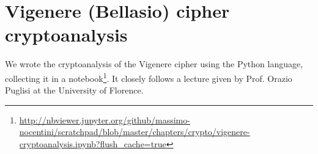 \section{Vigenere (Bellasio) cipher cryptoanalysis}

We wrote the cryptoanalysis of the Vigenere cipher using
the Python language, collecting it in a notebook\footnote{
\url{http://nbviewer.jupyter.org/github/massimo-nocentini/scratchpad/blob/master/chapters/crypto/vigenere-cryptoanalysis.ipynb?flush_cache=true}}. It closely follows a lecture given by Prof. Orazio Puglisi at 
the University of Florence.
